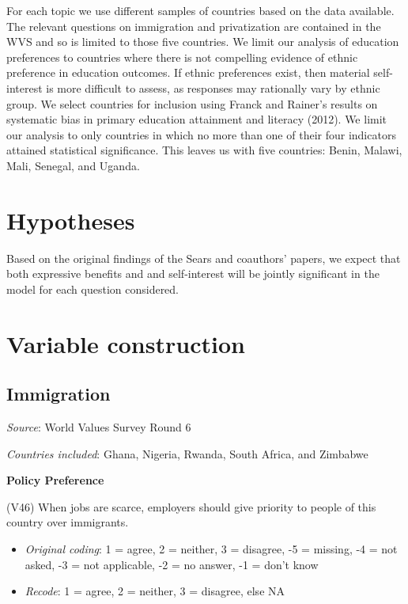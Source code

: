 \documentclass[]{article}
\begin{document}
For each topic we use different samples of countries based on the data
available. The relevant questions on immigration and privatization are
contained in the WVS and so is limited to those five countries. We limit
our analysis of education preferences to countries where there is not
compelling evidence of ethnic preference in education outcomes. If
ethnic preferences exist, then material self-interest is more difficult
to assess, as responses may rationally vary by ethnic group. We select
countries for inclusion using Franck and Rainer's results on systematic
bias in primary education attainment and literacy (2012). We limit our
analysis to only countries in which no more than one of their four
indicators attained statistical significance. This leaves us with five
countries: Benin, Malawi, Mali, Senegal, and Uganda.

\section{Hypotheses}\label{hypotheses}

Based on the original findings of the Sears and coauthors' papers, we
expect that both expressive benefits and and self-interest will be
jointly significant in the model for each question considered.

\section{Variable construction}\label{variable-construction}

\subsection{Immigration}\label{immigration}

\textit{Source}: World Values Survey Round 6

\textit{Countries included}: Ghana, Nigeria, Rwanda, South Africa, and
Zimbabwe

\textbf{Policy Preference}

(V46) When jobs are scarce, employers should give priority to people of
this country over immigrants.

\begin{itemize}

\item \textit{Original coding}: 1 = agree, 2 = neither, 3 = disagree, -5 = missing, -4 = not asked, -3 = not applicable, -2 = no answer, -1 = don't know 

\item \textit{Recode}: 1 = agree, 2 = neither, 3 = disagree, else NA

\end{itemize}
\end{document}
